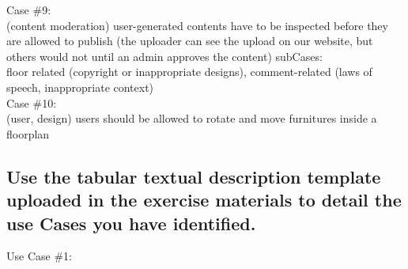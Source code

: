 			
			\noindent Case \#9:\\
			(content moderation)
			user-generated contents have to be inspected before they are allowed to publish (the uploader can see the upload on our website, but others would not until an admin approves the content)
			sub\noindent Cases:\\ floor related (copyright or inappropriate designs), comment-related (laws of speech, inappropriate context)\\
			
			
			\noindent Case \#10:\\
			(user, design)
			users should be allowed to rotate and move furnitures inside a floorplan\\
		
		
		
		\subsection{Use the tabular textual description template uploaded in the exercise materials
			to detail the use \noindent Cases you have identified.}
		
		\clearpage	
		
			Use Case \#1:
			
